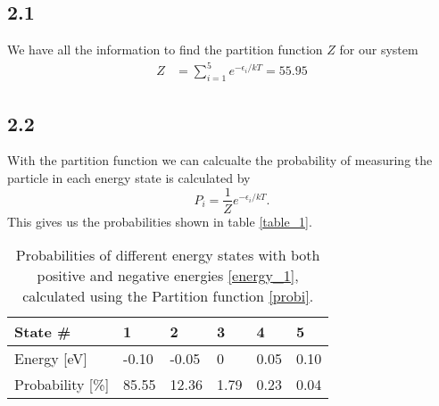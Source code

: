 \documentclass[a4paper,10pt, english]{article}
\begin{document}
\subsection*{2.1}
We have all the information to find the partition function $Z$ for our system
\begin{align}
    Z &= \sum_{i=1}^{5} e^{-\epsilon_i/kT} = 55.95 \label{party}
\end{align}
\subsection*{2.2}
With the partition function we can calcualte the probability of measuring the particle in each energy state is calculated by
\begin{equation}
    P_i = \frac{1}{Z}e^{-\epsilon_i/kT}.\label{probi}
\end{equation}
This gives us the probabilities shown in table \vref{table_1}.
\begin{table}[]
    \begin{center}
    \caption{Probabilities of different energy states with both positive and negative energies \eqref{energy_1}, calculated using the Partition function \eqref{probi}.}
    \begin{tabular}{@{}llllll@{}}
    \toprule
    State \#                & 1     & 2     & 3    & 4    & 5    \\ \midrule
    Energy {[}eV{]}      & -0.10 & -0.05 & 0    & 0.05 & 0.10 \\
    Probability {[}\%{]} & 85.55 & 12.36 & 1.79 & 0.23 & 0.04 \\ \bottomrule
    \end{tabular}
    \label{table_1}
    \end{center}
\end{table}
\end{document}
